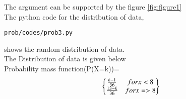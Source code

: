 \begin{enumerate}[label=\arabic*.,ref=\thesubsubsection.\theenumi]
\begin{enumerate}
The argument can be supported by the figure \ref{fig:figure1}
\\ 
The python code for the distribution of data,
\begin{lstlisting}
prob/codes/prob3.py
\end{lstlisting}
shows the random distribution of data.
\\
The Distribution of data is given below
\\
Probability mass function(P(X=k))=
\begin{align}
\begin{Bmatrix}\frac{k-1}{36}& for x<8\\\frac{13-k}{36}& for x=>8\end{Bmatrix}
\end{align}
\end{enumerate}
\end{enumerate}
